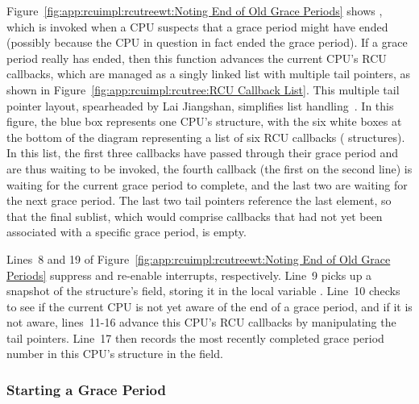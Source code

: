 Figure~\ref{fig:app:rcuimpl:rcutreewt:Noting End of Old Grace Periods}
shows , which is invoked when a CPU suspects
that a grace period might have ended (possibly because the CPU in question
in fact ended the grace period).
If a grace period really has ended, then this function advances the
current CPU's RCU callbacks, which are managed as a singly linked
list with multiple tail pointers, as shown in
Figure~\ref{fig:app:rcuimpl:rcutree:RCU Callback List}.
This multiple tail pointer layout, spearheaded by
Lai Jiangshan, simplifies list
handling~\cite{LaiJiangshan2008NewClassicAlgorithm}.
In this figure, the blue box represents one CPU's 
structure, with the six white boxes at the bottom of the diagram
representing a list of six RCU callbacks ( structures).
In this list, the first three callbacks have passed through their
grace period and are thus waiting to be invoked, the fourth
callback (the first on the second line) is waiting for the current
grace period to complete, and the last two are waiting for the
next grace period.
The last two tail pointers reference the last element, so that the
final sublist, which would comprise callbacks that had not yet been
associated with a specific grace period, is empty.

Lines~8 and 19 of
Figure~\ref{fig:app:rcuimpl:rcutreewt:Noting End of Old Grace Periods}
suppress and re-enable interrupts, respectively.
Line~9 picks up a snapshot of the  structure's
 field, storing it in the local variable
.
Line~10 checks to see if the current CPU is not yet aware of the
end of a grace period, and if it is not aware,
lines~11-16 advance this CPU's RCU callbacks by manipulating the
tail pointers.
Line~17 then records the most recently completed grace period number
in this CPU's  structure in the 
field.

\subsubsection{Starting a Grace Period}
\label{app:rcuimpl:rcutreewt:Starting a Grace Period}


